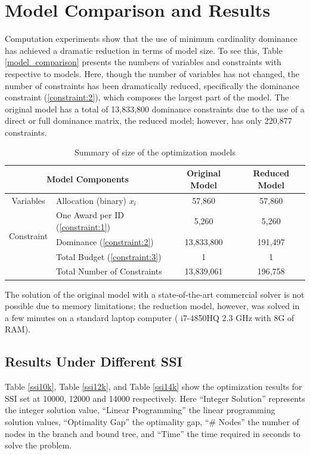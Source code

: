 \documentclass[12pt,english]{report}
\begin{document}
\section{Model Comparison and Results}
Computation experiments show that the use of minimum cardinality dominance has achieved a dramatic reduction in terms of model size.  To see this, Table \ref{model_comparison} presents the numbers of variables and constraints with respective to models. Here, though the number of variables has not changed, the number of constraints has been dramatically reduced, specifically the dominance constraint (\ref{constraint:2}), which composes the largest part of the model. The original model has a total of 13,833,800 dominance constraints due to the use of a direct or full dominance matrix, the reduced model; however, has only 220,877 constraints.

\begin{table}[H]
\centering
\begin{tabular}{|c|l|c|c|}
\hline \hline
\multicolumn{2}{|c|}{Model Components}                                        &
Original Model & Reduced Model \\ \hline
Variables                   & \multicolumn{1}{|l|}{Allocation (binary)  $x_i$}
& 57,860         & 57,860        \\ \hline
\multirow{3}{*}{Constraint} & One Award per ID  (\ref{constraint:1})        &
5,260          & 5,260         \\ \cline{2-4}
& Dominance  (\ref{constraint:2})               & 13,833,800     & 191,497
\\ \cline{2-4}
& Total Budget   (\ref{constraint:3})           & 1              & 1
\\ \cline{2-4}
& Total Number of Constraints                   & 13,839,061     & 196,758
\\ \hline
\end{tabular}
\caption{Summary of size of the optimization models }
\label{model_comparison}
\label{size_model}
\end{table}

The solution of the original model with a state-of-the-art commercial solver is not possible due to memory limitations; the reduction model, however,  was solved in a few minutes on a standard laptop computer ( i7-4850HQ 2.3 GHz with 8G of RAM).

\subsection{Results Under Different SSI}
Table \ref{ssi10k}, Table \ref{ssi12k}, and Table \ref{ssi14k} show the optimization results for SSI set at 10000, 12000 and 14000 respectively.  Here  ``Integer Solution'' represents the integer solution value,  ``Linear Programming'' the linear programming solution values, ``Optimality Gap'' the optimality gap,  ``\# Nodes'' the number of nodes in the branch and bound tree,  and ``Time'' the time required in seconds to solve the problem. 
\end{document}

